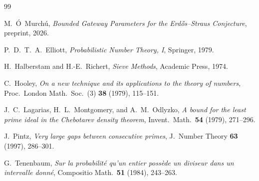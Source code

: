 \documentclass[12pt]{amsart}
\theoremstyle{definition}
\theoremstyle{remark}
\begin{document}
\begin{thebibliography}{99}

M.~\'O~Murch\'u,
\emph{Bounded Gateway Parameters for the
Erd\H{o}s--Straus Conjecture}, preprint, 2026.

P.~D.~T.~A.~Elliott,
\emph{Probabilistic Number Theory, I}, Springer, 1979.

H.~Halberstam and H.-E.~Richert,
\emph{Sieve Methods}, Academic Press, 1974.

C.~Hooley,
\emph{On a new technique and its applications to the theory of numbers},
Proc.\ London Math.\ Soc.\ (3) \textbf{38} (1979), 115--151.

J.~C.~Lagarias, H.~L.~Montgomery, and A.~M.~Odlyzko,
\emph{A bound for the least prime ideal in the Chebotarev density theorem},
Invent.\ Math.\ \textbf{54} (1979), 271--296.

J.~Pintz,
\emph{Very large gaps between consecutive primes},
J.\ Number Theory \textbf{63} (1997), 286--301.

G.~Tenenbaum,
\emph{Sur la probabilit\'e qu'un entier poss\`ede un diviseur dans un
intervalle donn\'e}, Compositio Math.\ \textbf{51} (1984), 243--263.

\end{thebibliography}
\end{document}
